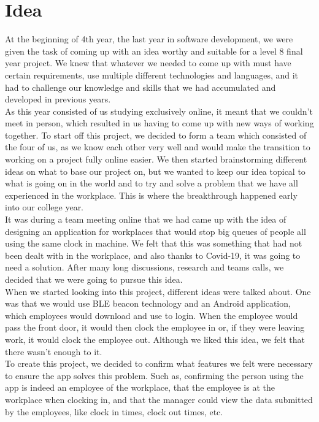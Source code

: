 \section{Idea} At the beginning of 4th year, the last year in software development, we were given the task of coming up with an idea worthy and suitable for a level 8 final year project. We knew that whatever we needed to come up with must have certain requirements, use multiple different technologies and languages, and it had to challenge our knowledge and skills that we had accumulated and developed in previous years. 
\\
As this year consisted of us studying exclusively online, it meant that we couldn't meet in person, which resulted in us having to come up with new ways of working together. To start off this project, we decided to form a team which consisted of the four of us, as we know each other very well and would make the transition to working on a project fully online easier. We then started brainstorming different ideas on what to base our project on, but we wanted to keep our idea topical to what is going on in the world and to try and solve a problem that we have all experienced in the workplace. This is where the breakthrough happened early into our college year. 
\\
It was during a team meeting online that we had came up with the idea of designing an application for workplaces that would stop big queues of people all using the same clock in machine. We felt that this was something that had not been dealt with in the workplace, and also thanks to Covid-19, it was going to need a solution. After many long discussions, research and teams calls, we decided that we were going to pursue this idea.
\\
When we started looking into this project, different ideas were talked about. One was that we would use BLE beacon technology and an Android application, which employees would download and use to login. When the employee would pass the front door, it would then clock the employee in or, if they were leaving work, it would clock the employee out. Although we liked this idea, we felt that there wasn't enough to it. 
\\
To create this project, we decided to confirm what features we felt were necessary to ensure the app solves this problem. Such as, confirming the person using the app is indeed an employee of the workplace, that the employee is at the workplace when clocking in, and that the manager could view the data submitted by the employees, like clock in times, clock out times, etc.
